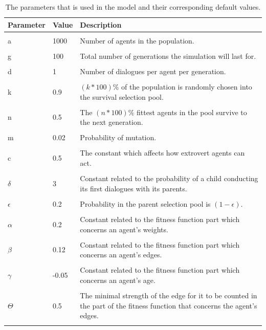 \begin{table}[htbp]
    \centering
    \caption[The parameters that is used in the model and their corresponding default values.]{The parameters that is used in the model and their corresponding default values.}\label{tab:params}
    \begin{tabu} to 1.0\textwidth { X[1,c] X[1,c] X[5,p] }%
         \hline
         \rowfont\bfseries
         Parameter & Value & Description \\ 
         \hline
         \\
         a & 1000 & Number of agents in the population. \\ 
         \\
         g & 100 & Total number of generations the simulation will last for. \\
        \\
         d & 1 & Number of dialogues per agent per generation. \\
        \\
         k & 0.9 & $(k \ast 100 )\%$ of the population is randomly chosen into the survival selection pool. \\
        \\
         n & 0.5 & The $(n \ast 100 )\%$ fittest agents in the pool survive to the next generation. \\ 
        \\
         m & 0.02 & Probability of mutation. \\
        \\
         c & 0.5 & The constant which affects how extrovert agents can act. \\
         \\
         $\delta$ & 3 & Constant related to the probability of a child conducting its first dialogues with its parents.\\
        \\
         $\epsilon$ & 0.2 & Probability in the parent selection pool is $(1-\epsilon)$.\\ 
        \\
          $\alpha$ & 0.2 & Constant related to the fitness function part which concerns an agent's weights.\\
        \\
          $\beta$ & 0.12 & Constant related to the fitness function part which concerns an agent's edges. \\
        \\
         $\gamma$ & -0.05 & Constant related to the fitness function part which concerns an agent's age. \\
         \\
         $\Theta$ & 0.5 & The minimal strength of the edge for it to be counted in the part of the fitness function that concerns the agent's edges.\\
         \\
         \hline
    \end{tabu}
\end{table}

